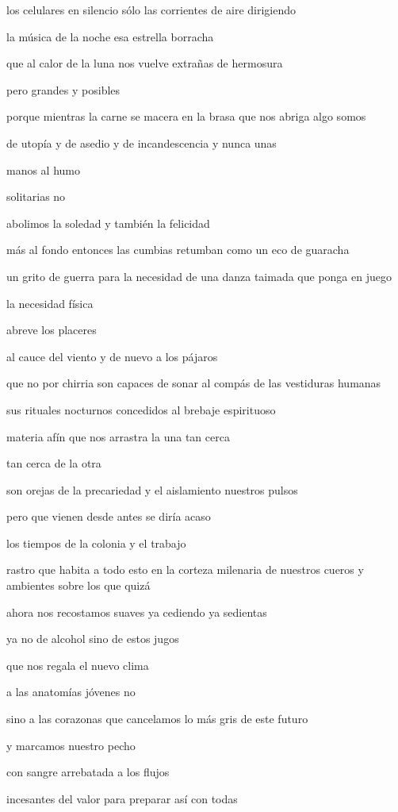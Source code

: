 \documentclass[
]{book}
\begin{document}
los celulares en silencio sólo las corrientes de aire dirigiendo

la música de la noche esa estrella borracha

que al calor de la luna nos vuelve extrañas de hermosura

pero grandes y posibles

porque mientras la carne se macera en la brasa que nos abriga algo somos

de utopía y de asedio y de incandescencia y nunca unas

manos al humo

solitarias no

abolimos la soledad y también la felicidad

más al fondo entonces las cumbias retumban como un eco de guaracha

un grito de guerra para la necesidad de una danza taimada que ponga en juego

la necesidad física

abreve los placeres

al cauce del viento y de nuevo a los pájaros

que no por chirria son capaces de sonar al compás de las vestiduras humanas

sus rituales nocturnos concedidos al brebaje espirituoso

materia afín que nos arrastra la una tan cerca

tan cerca de la otra

son orejas de la precariedad y el aislamiento nuestros pulsos

pero que vienen desde antes se diría acaso

los tiempos de la colonia y el trabajo

rastro que habita a todo esto en la corteza milenaria de nuestros cueros y ambientes sobre los que quizá

ahora nos recostamos suaves ya cediendo ya sedientas

ya no de alcohol sino de estos jugos

que nos regala el nuevo clima

a las anatomías jóvenes no

sino a las corazonas que cancelamos lo más gris de este futuro

y marcamos nuestro pecho

con sangre arrebatada a los flujos

incesantes del valor para preparar así con todas
\end{document}
